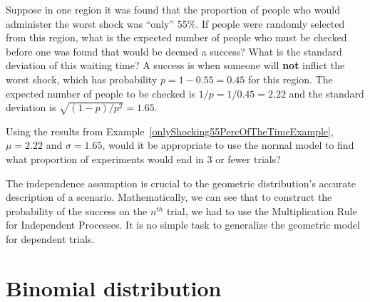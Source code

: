 \begin{examplewrap}
\begin{nexample}{Suppose in one region it was found that the proportion of people who would administer the worst shock was ``only'' 55\%. If people were randomly selected from this region, what is the expected number of people who must be checked before one was found that would be deemed a success? What is the standard deviation of this waiting time?} \label{onlyShocking55PercOfTheTimeExample}
A success is when someone will \textbf{not} inflict the worst shock, which has probability $p=1-0.55=0.45$ for this region. The expected number of people to be checked is $1/p = 1/0.45 = 2.22$ and the standard deviation is $\sqrt{(1-p)/p^2} = 1.65$.
\end{nexample}
\end{examplewrap}

\begin{exercisewrap}
\begin{nexercise}
Using the results from Example~\ref{onlyShocking55PercOfTheTimeExample}, $\mu = 2.22$ and $\sigma = 1.65$, would it be appropriate to use the normal model to find what proportion of experiments would end in 3 or fewer trials?\footnotemark
\end{nexercise}
\end{exercisewrap}

The independence assumption is crucial to the geometric distribution's accurate description of a scenario. Mathematically, we can see that to construct the probability of the success on the $n^{th}$ trial, we had to use the Multiplication Rule for Independent Processes. It is no simple task to generalize the geometric model for dependent trials.




\section{Binomial distribution}
\label{binomialModel}



